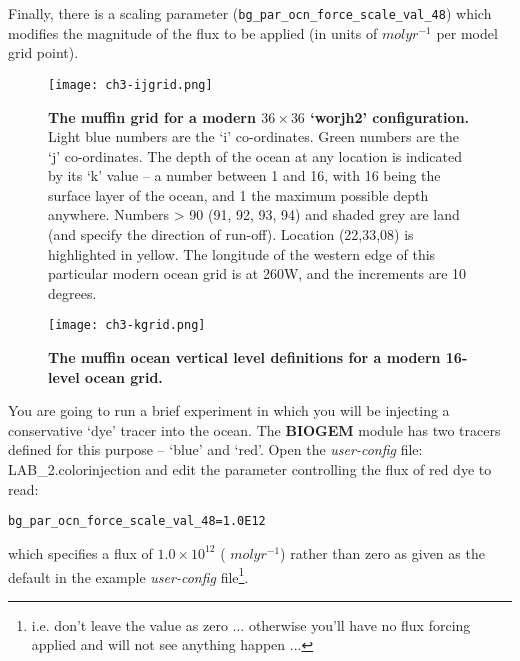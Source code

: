 Finally, there is a scaling parameter (\texttt{bg\_par\_ocn\_force\_scale\_val\_48}) which modifies the magnitude of the flux to be applied (in units of \(mol yr^{-1}\) per model grid point).

\newpage 

%
\begin{figure}
\texttt{[image: ch3-ijgrid.png]}\centering
\vspace{-0mm}
\caption{
\textbf{The  muffin grid for a modern \(36\times36\) ‘worjh2’ configuration.} Light blue numbers are the ‘i’ co-ordinates. Green numbers are the ‘j’ co-ordinates.
The depth of the ocean at any location is indicated by its ‘k’ value – a number between 1 and 16, with 16 being the surface layer of the ocean, and 1 the maximum possible depth anywhere.
Numbers > 90 (91, 92, 93, 94) and shaded grey are land (and specify the direction of run-off).
Location (22,33,08) is highlighted in yellow.
The longitude of the western edge of this particular modern ocean grid is at 260W, and the increments are 10 degrees.
}
\label{fig:ch3-ijgrid}
\end{figure}

\begin{figure}
\texttt{[image: ch3-kgrid.png]}\centering
\vspace{-0mm}
\caption{\textbf{The muffin ocean vertical level definitions for a modern 16-level ocean grid.}}
\label{fig:ch3-kgrid}
\end{figure}

\noindent You are going to run a brief experiment in which you will be injecting a conservative ‘dye’ tracer into the ocean. The \textbf{BIOGEM} module has two tracers defined for this purpose – ‘blue’ and ‘red’. Open the \textit{user-config} file: \textsf{\footnotesize LAB\_2.colorinjection} and edit the parameter controlling the flux of red dye to read:

\vspace{-2mm}\small
\begin{verbatim}
bg_par_ocn_force_scale_val_48=1.0E12
\end{verbatim}
\normalsize\vspace{-2mm}

\noindent which specifies a flux of \(1.0\times10^{12}\) ( \(mol yr^{-1}\)) rather than zero as given as the default in the example \textit{user-config} file\footnote{i.e. don't leave the value as zero ... otherwise you'll have no flux forcing applied and will not see anything happen ...}.

